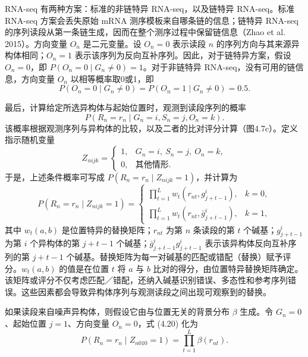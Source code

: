 

RNA-seq 有两种方案：标准的非链特异 RNA-seq，以及链特异 RNA-seq。标准 RNA-seq 方案会丢失原始 mRNA 测序模板来自哪条链的信息；链特异 RNA-seq 的序列读段从第一条链生成，因而在整个测序过程中保留链信息（Zhao et al. 2015）。方向变量 $O_n$ 是二元变量。设 $O_n=0$ 表示读段 $n$ 的序列方向与其来源异构体相同；$O_n=1$ 表示该序列为反向互补序列。因此，对于链特异方案，假设 $O_n=0$，即 $P(O_n=0\mid G_n\ne0)=1$。对于非链特异 RNA-seq，没有可用的链信息，方向变量 $O_n$ 以相等概率取0或1，即
\[
P(O_n=0\mid G_n\ne0)=P(O_n=1\mid G_n\ne0)=0.5.
\]

最后，计算给定所选异构体与起始位置时，观测到读段序列的概率
\[
P(R_n=r_n\mid G_n=i,S_n=j,O_n=k).
\]
该概率根据观测序列与异构体的比较，以及二者的比对评分计算（图4.7c）。定义指示随机变量
\begin{equation}
Z_{nijk}=\begin{cases}
1,&G_n=i,\ S_n=j,\ O_n=k,\\
0,&\text{其他情形}.
\end{cases}
\tag{4.19}
\end{equation}
于是，上述条件概率可写成 $P(R_n=r_n\mid Z_{nijk}=1)$，并计算为
\begin{equation}
P(R_n=r_n\mid Z_{nijk}=1)=\begin{cases}
\displaystyle\prod_{t=1}^{L}w_t(r_{nt},g_{j+t-1}^{i}),&k=0,\\[1ex]
\displaystyle\prod_{t=1}^{L}w_t(r_{nt},\bar g_{j+t-1}^{i}),&k=1,
\end{cases}
\tag{4.20}
\end{equation}
其中 $w_t(a,b)$ 是位置特异的替换矩阵；$r_{nt}$ 为第 $n$ 条读段的第 $t$ 个碱基；$g_{j+t-1}^{i}$ 为第 $i$ 个异构体的第 $j+t-1$ 个碱基；$\bar g_{j+t-1}^{i}g_{j+t-1}^{i}$ 表示该异构体反向互补序列的第 $j+t-1$ 个碱基。替换矩阵为每一对碱基的匹配或错配（替换）赋予评分。$w_t(a,b)$ 的值是在位置 $t$ 将 $a$ 与 $b$ 比对的得分，由位置特异替换矩阵确定。该矩阵或评分不仅考虑匹配／错配，还纳入碱基识别错误、多态性和参考序列错误。这些因素都会导致异构体序列与观测读段之间出现可观察到的替换。

如果读段来自噪声异构体，则假设它由与位置无关的背景分布 $\beta$ 生成。令 $G_n=0$、起始位置 $j=1$、方向变量 $O_n=0$，式 (4.20) 化为
\begin{equation}
P(R_n=r_n\mid Z_{n010}=1)=\prod_{t=1}^{L}\beta(r_{nt}).
\tag{4.21}
\end{equation}



